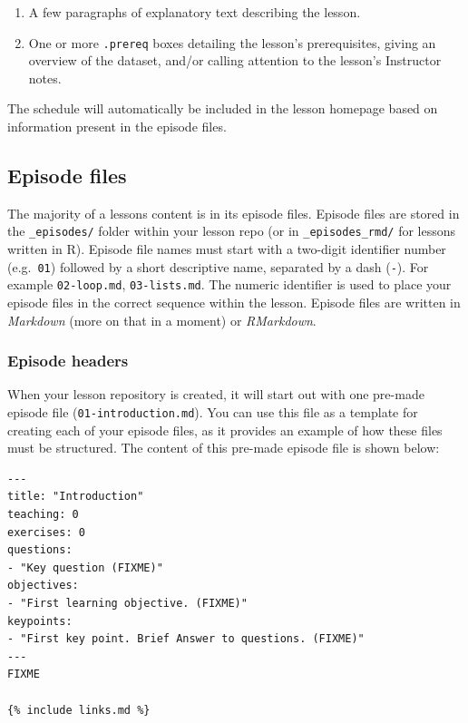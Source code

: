 \documentclass[
]{book}
\providecommand{\tightlist}{%
  \setlength{\itemsep}{0pt}\setlength{\parskip}{0pt}}
\begin{document}
\begin{enumerate}
\def\labelenumi{\arabic{enumi}.}
\tightlist
\item
  A few paragraphs of explanatory text describing the lesson.
\item
  One or more \texttt{.prereq} boxes detailing the lesson's prerequisites, giving an overview of the dataset, and/or calling attention to the lesson's Instructor notes.
\end{enumerate}

The schedule will automatically be included in the lesson homepage based on information present in the
episode files.

\hypertarget{episode-files}{%
\subsection{Episode files}\label{episode-files}}

The majority of a lessons content is in its episode files.
Episode files are stored in the \texttt{\_episodes/} folder within your lesson repo (or in \texttt{\_episodes\_rmd/} for lessons written in R).
Episode file names must start with a two-digit identifier number (e.g.~\texttt{01}) followed
by a short descriptive name, separated by a dash (\texttt{-}). For example \texttt{02-loop.md}, \texttt{03-lists.md}.
The numeric identifier is used to place your episode files in the correct sequence within the lesson.
Episode files are written in \emph{Markdown} (more on that in a moment) or \emph{RMarkdown}.

\hypertarget{episode-headers}{%
\subsubsection{Episode headers}\label{episode-headers}}

When your lesson repository is created, it will start out with one pre-made episode file (\texttt{01-introduction.md}).
You can use this file as a template for creating each of your episode files, as it provides an
example of how these files must be structured. The content of this pre-made episode file is shown below:

\begin{verbatim}
---
title: "Introduction"
teaching: 0
exercises: 0
questions:
- "Key question (FIXME)"
objectives:
- "First learning objective. (FIXME)"
keypoints:
- "First key point. Brief Answer to questions. (FIXME)"
---
FIXME

{% include links.md %}
\end{verbatim}
\end{document}
